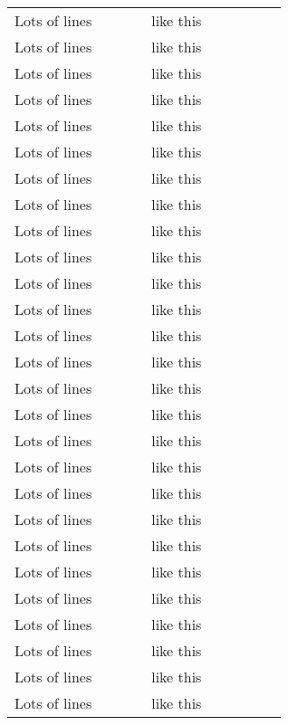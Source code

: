 \begin{longtable}[H]{|m{0.3\linewidth}|m{0.3\linewidth}|}
  Lots of lines & like this                             \\
  Lots of lines & like this                             \\
  Lots of lines & like this                             \\
  Lots of lines & like this                             \\
  Lots of lines & like this                             \\
  Lots of lines & like this                             \\
  Lots of lines & like this                             \\
  Lots of lines & like this                             \\
  Lots of lines & like this                             \\
  Lots of lines & like this                             \\
  Lots of lines & like this                             \\
  Lots of lines & like this                             \\
  Lots of lines & like this                             \\
  Lots of lines & like this                             \\
  Lots of lines & like this                             \\
  Lots of lines & like this                             \\
  Lots of lines & like this                             \\
  Lots of lines & like this                             \\
  Lots of lines & like this                             \\
  Lots of lines & like this                             \\
  Lots of lines & like this                             \\
  Lots of lines & like this                             \\
  Lots of lines & like this                             \\
  Lots of lines & like this                             \\
  Lots of lines & like this                             \\
  Lots of lines & like this                             \\
  Lots of lines & like this                             \\

\end{longtable}
